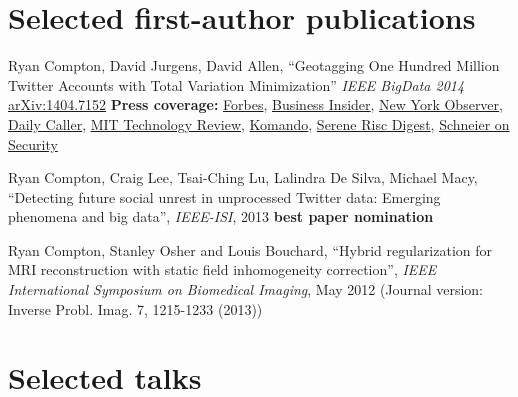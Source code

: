 \documentclass[margin,line]{res}
\begin{document}
\begin{resume}
\section{\sc Selected first-author publications}

Ryan Compton, David Jurgens, David Allen, ``Geotagging One Hundred Million Twitter Accounts with Total Variation Minimization'' {\it IEEE BigData 2014} \href{https://arxiv.org/abs/1404.7152}{arXiv:1404.7152} {\bf Press coverage:} \href{http://www.forbes.com/sites/thomasbrewster/2015/03/07/twitter-location-can-be-determined-through-friends/}{Forbes}, \href{http://www.businessinsider.com/twitter-location-research-at-mentions-cornell-2015-3}{Business Insider}, \href{http://observer.com/2015/03/you-dont-have-to-geotag-your-tweets-to-give-away-your-location/}{New York Observer}, \href{http://dailycaller.com/2015/03/06/how-your-tweets-can-reveal-your-real-location/}{Daily Caller}, \href{http://www.technologyreview.com/view/527246/other-interesting-arxiv-papers-week-ending-may-10-2014/}{MIT Technology Review}, \href{http://www.komando.com/happening-now/299085/forget-gps-hackers-can-pinpoint-your-exact-location-using-social-media/all}{Komando}, \href{http://ryancompton.net/assets/resume/Serene_Risc_Digest_2015_Spring.pdf}{Serene Risc Digest}, \href{http://www.schneier.com/blog/archives/2015/03/geotagging_twit.html}{Schneier on Security}

Ryan Compton, Craig Lee, Tsai-Ching Lu, Lalindra De Silva, Michael Macy, ``Detecting future social unrest in unprocessed Twitter data: Emerging phenomena and big data'', {\it IEEE-ISI}, 2013 {\bf best paper nomination}

Ryan Compton, Stanley Osher and Louis Bouchard, ``Hybrid regularization for MRI reconstruction with static field inhomogeneity correction'', {\it IEEE International Symposium on Biomedical Imaging}, May 2012 (Journal version: Inverse Probl. Imag. 7, 1215-1233 (2013))

\section{\sc Selected talks}


\end{resume}
\end{document}
